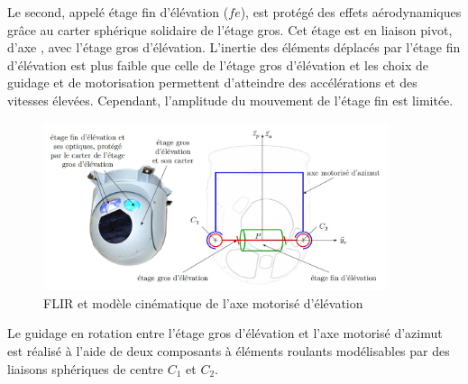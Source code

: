 \FloatBarrier

Le second, appelé étage fin d'élévation ($fe$), est protégé
des effets aérodynamiques grâce au carter sphérique
solidaire de l'étage gros. Cet étage est en liaison pivot,
d'axe , avec l'étage gros d'élévation. L'inertie des
éléments déplacés par l'étage fin d'élévation est plus faible
que celle de l'étage gros d'élévation et les choix de guidage
et de motorisation permettent d'atteindre des accélérations
et des vitesses élevées. Cependant, l'amplitude du mouvement de l'étage fin est limitée.

\begin{figure}[!htb]
\begin{center}
\includegraphics[width=0.9\textwidth]{images/figure10.jpg}
\caption{FLIR et modèle cinématique de l'axe motorisé d'élévation \label{figure10}}
\end{center}
\end{figure}

Le guidage en rotation entre l'étage gros d'élévation et l'axe motorisé d'azimut est réalisé à l'aide de deux
composants à éléments roulants modélisables par des liaisons sphériques de centre $C_1$ et $C_2$.

